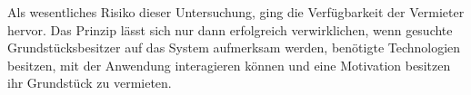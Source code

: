 Als wesentliches Risiko dieser Untersuchung, ging die Verfügbarkeit der Vermieter hervor. Das Prinzip lässt sich nur dann erfolgreich verwirklichen, wenn gesuchte Grundstücksbesitzer auf das System aufmerksam werden, benötigte Technologien besitzen, mit der Anwendung interagieren können und eine Motivation besitzen ihr Grundstück zu vermieten. 
